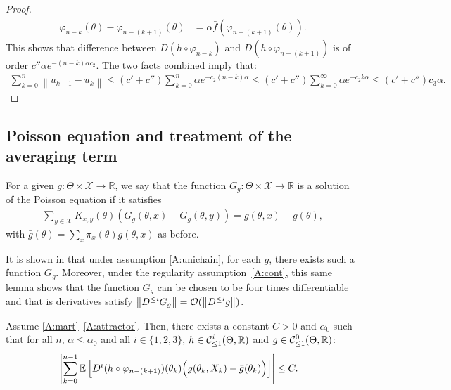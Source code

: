 \documentclass{article}
\newcommand{\R}{\mathbb{R}}
\newcommand{\calX}{\mathcal{X}}
\newcommand\E{\mathbb{E}}
\newcommand\esp[1]{\E\left[#1\right]}
\newcommand\abs[1]{\left|#1\right|}
\newcommand\norm[1]{\left\|#1\right\|}
\newcommand\bO[1]{\mathcal{O}(#1)}
\newcommand\barf{\bar{f}}
\newcommand\normop[2][]{\norm{D^{\ifthenelse{\equal{#1}{}}{}{\le #1}}#2}}
\newcommand\cont[3][]{\mathcal{C}^{#2}_{\ifthenelse{\equal{#1}{all}}{}{\le1}}(#3,\R)}
\begin{document}
\begin{proof}
    \begin{align*}
        \varphi_{n-k}(\theta) - \varphi_{n-(k+1)} (\theta) &= \alpha \barf(\varphi_{n-(k+1)}(\theta)).
    \end{align*}
    This shows that difference between $D(h \circ \varphi_{n-k})$ and $D(h \circ \varphi_{n-(k+1)})$ is of order $c''\alpha e^{-(n-k)\alpha c_2}$. The two facts combined imply that:
    \begin{align*}
        \sum_{k=0}^n \norm{u_{k-1}-u_k}\le (c'+c'')  \sum_{k=0}^n \alpha e^{-c_2(n-k)\alpha} \le  (c'+c'')\sum_{k=0}^\infty \alpha e^{-c_2k\alpha}\le (c'+c'')c_3 \alpha.
    \end{align*}
\end{proof}

\subsection{Poisson equation and treatment of the averaging term}
\label{ssec:proof_lemma_poisson}

For a given $g:\Theta\times\calX\to\R$, we say that the function $G_g:\Theta\times\calX\to\R$ is a solution of the Poisson equation if it satisfies
\begin{align}
    \label{eq:Poisson}
    \sum_{y\in\calX} K_{x,y}(\theta)(G_g(\theta, x)-G_g(\theta, y)) = g(\theta, x) - \bar{g}(\theta),
\end{align}
with $\bar{g}(\theta)=\sum_x \pi_x(\theta)g(\theta,x)$  as before. 

It is shown in \cite[Lemma~4]{allmeier2023bias} that under assumption \ref{A:unichain}, for each $g$, there exists such a function $G_g$. Moreover, under the regularity assumption~\ref{A:cont}, this same lemma shows that the function $G_g$ can be chosen to be four times differentiable and that is derivatives satisfy $\normop[i]{G_g}=\bO{\normop[i]{g}}$.

\begin{lemma}
    \label{lem:Poisson}
    Assume \ref{A:mart}--\ref{A:attractor}. Then, there exists a constant $C>0$ and $\alpha_0$ such that for all $n$, $\alpha\le\alpha_0$ and all $i\in\{1,2,3\}$, $h\in\cont{i}{\Theta}$ and $g\in\cont{0}{\Theta}$:
    \begin{align}
        & \abs{ \sum_{k=0}^{n-1}\esp{D^i(h \circ \varphi_{n-(k+1)})(\theta_{k}) \Bigl( g(\theta_{k},X_{k})- \bar{g}(\theta_{k}) \Bigr)} } \leq C. \label{eq:decoupled_accuracy_lemma}
    \end{align}
\end{lemma}
\end{document}
